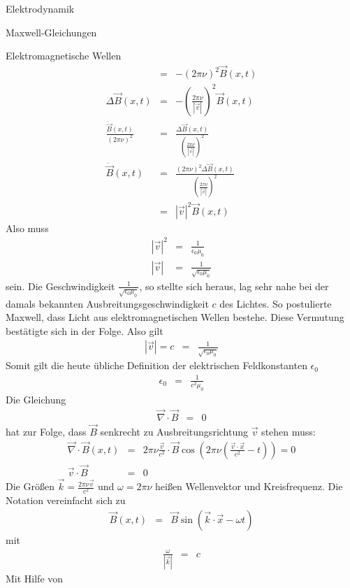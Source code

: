 \begin{chapter}{\titlestr}
\begin{section}{Elektrodynamik}
\begin{subsection}{Maxwell-Gleichungen}
\begin{subsubsection}{Elektromagnetische Wellen}
\begin{eqnarray*}
&=& -(2\pi\nu)^2\vec{B}(x,t)\\
\Delta \vec{B}(x,t) &=& -\left(\frac{2\pi\nu}{|\vec{v}|}\right)^2\vec{B}(x,t)\\
\frac{\ddot{\vec{B}}(x,t)}{(2\pi\nu)^2} &=&\frac{\Delta \vec{B}(x,t)}{\left(\frac{2\pi\nu}{|\vec{v}|}\right)^2}\\
\ddot{\vec{B}}(x,t) &=&\frac{(2\pi\nu)^2\Delta \vec{B}(x,t)}{\left(\frac{2\pi\nu}{|\vec{v}|}\right)^2}\\
&=&|\vec{v}|^2\vec{B}(x,t)
\end{eqnarray*}
Also muss
\begin{eqnarray*}
|\vec{v}|^2 &=& \frac{1}{\epsilon_0\mu_0}\\
|\vec{v}| &=& \frac{1}{\sqrt{\epsilon_0\mu_0}}
\end{eqnarray*}
sein. Die Geschwindigkeit $\frac{1}{\sqrt{\epsilon_0\mu_0}}$, so stellte sich heraus, lag sehr nahe bei der damals bekannten Ausbreitungsgeschwindigkeit $c$ des Lichtes.
So postulierte Maxwell, dass Licht aus elektromagnetischen Wellen bestehe. Diese Vermutung bestätigte sich in der Folge. Also gilt
\begin{eqnarray*}
|\vec{v}| = c &=& \frac{1}{\sqrt{\epsilon_0\mu_0}}
\end{eqnarray*}
Somit gilt die heute übliche Definition der elektrischen Feldkonstanten $\epsilon_0$
\begin{eqnarray*}
\epsilon_0 &=& \frac{1}{c^2\mu_0}
\end{eqnarray*}
Die Gleichung
\begin{eqnarray*}
\vec{\nabla}\cdot\vec{B} &=& 0
\end{eqnarray*}
hat zur Folge, dass $\vec{B}$ senkrecht zu Ausbreitungsrichtung $\vec{v}$ stehen muss:
\begin{eqnarray*}
\vec{\nabla}\cdot\vec{B}(x,t) &=& 2\pi\nu\frac{\vec{v}}{c^2}\cdot\vec{B}\cos\left(2\pi\nu\left(\frac{\vec{v}\cdot \vec{x}}{c^2}- t\right)\right)=0\\
\vec{v}\cdot\vec{B} &=& 0
\end{eqnarray*}
Die Größen $\vec{k}=\frac{2\pi\nu\vec{v}}{c^2}$ und $\omega=2\pi\nu$ heißen Wellenvektor und Kreisfrequenz. Die Notation vereinfacht sich zu
\begin{eqnarray*}
\vec{B}(x,t) &=& \vec{B}\sin\left(\vec{k}\cdot \vec{x}- \omega t\right)
\end{eqnarray*}
mit
\begin{eqnarray*}
\frac{\omega}{|\vec{k}|} &=& c
\end{eqnarray*}
Mit Hilfe von
\begin{eqnarray*}

\end{eqnarray*}
\end{subsubsection}
\end{subsection}
\end{section}
\end{chapter}
